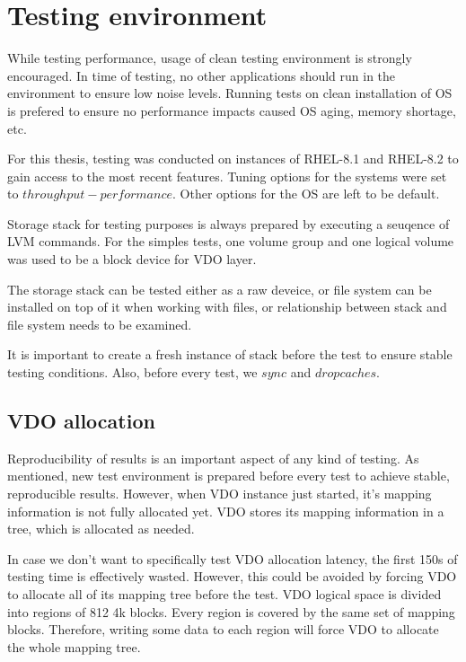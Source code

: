 \documentclass[
  color, %
  table, %
  lof,   %
  lot,   %
]{fithesis3}
\begin{document}
\section{Testing environment}
While testing performance, usage of clean testing environment is strongly encouraged. In time of testing, no other applications should run in the environment to ensure low noise levels. Running tests on clean installation of OS is prefered to ensure no performance impacts caused OS aging, memory shortage, etc.

For this thesis, testing was conducted on instances of RHEL-8.1 and RHEL-8.2 to gain access to the most recent features. Tuning options for the systems were set to $throughput-performance$. Other options for the OS are left to be default.

Storage stack for testing purposes is always prepared by executing a seuqence of LVM commands. For the simples tests, one volume group and one logical volume was used to be a block device for VDO layer.

The storage stack can be tested either as a raw deveice, or file system can be installed on top of it when working with files, or relationship between stack and file system needs to be examined.

It is important to create a fresh instance of stack before the test to ensure stable testing conditions. Also, before every test, we $sync$ and $drop caches$. 

\subsection{VDO allocation}
\label{alloc}
Reproducibility of results is an important aspect of any kind of testing. As mentioned, new test environment is prepared before every test to achieve stable, reproducible results. However, when VDO instance just started, it's mapping information is not fully allocated yet. VDO stores its mapping information in a tree, which is allocated as needed.


In case we don't want to specifically test VDO allocation latency, the first 150s of testing time is effectively wasted. However, this could be avoided by forcing VDO to allocate all of its mapping tree before the test. VDO logical space is divided into regions of 812 4k blocks. Every region is covered by the same set of mapping blocks. Therefore, writing some data to each region will force VDO to allocate the whole mapping tree. 
\end{document}
